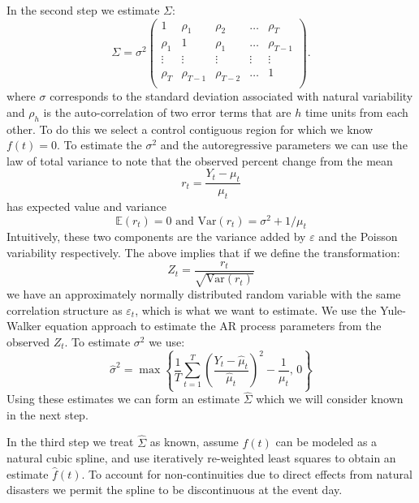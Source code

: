 \documentclass[11pt]{article}
\begin{document}
In the second step we estimate $\Sigma$:
\begin{equation*}
    \Sigma = \sigma^2
    \begin{pmatrix} 1 & \rho_1 & \rho_{2} & \dots & \rho_{T} \\ 
    \rho_{1} & 1 & \rho_{1} & \ldots & \rho_{T-1} \\
    \vdots & \vdots & \vdots & \vdots & \vdots \\
    \rho_{T} & \rho_{T-1} & \rho_{T-2} & \dots & 1 \\ 
    \end{pmatrix}.
\end{equation*}
where $\sigma$ corresponds to the standard deviation associated with natural variability and $\rho_h$ is the auto-correlation of two error terms that are $h$ time units from each other. To do this we select a control contiguous region for which we know $f(t)=0$. To estimate the $\sigma^2$ and the autoregressive parameters we can use the law of total variance to note that the observed percent change from the mean
\begin{equation*}
    r_t = \frac{Y_t - \mu_t}{\mu_t}
\end{equation*}
has expected value and variance
\begin{equation*}
    \mathbb{E}\left(r_t \right) = 0 \mbox{ and } \mbox{Var}\left(r_t\right)= \sigma^2 + 1/\mu_t
\end{equation*}
Intuitively, these two components are the variance added by $\varepsilon$ and the Poisson variability respectively. The above implies that if we define the transformation:
\begin{equation*}
    Z_t = \frac{r_t}{\sqrt{\mbox{Var}\left(r_t\right)}}
\end{equation*}
we have an approximately normally distributed random variable with the same correlation structure as $\varepsilon_t$, which is what we want to estimate. We use the Yule-Walker equation approach to estimate the AR process parameters from the observed $Z_t$. To estimate $\sigma^2$ we use:
\begin{equation*}
    \hat{\sigma}^2 = \max\left\{ \frac{1}{T}\sum_{t=1}^T  \left(\frac{Y_t - \hat{\mu}_t}{\hat{\mu}_t}\right)^2  - \frac{1}{\mu_t}, \, 0\right\}
\end{equation*}
Using these estimates we can form an estimate $\hat{\Sigma}$ which we will consider known in the next step.

In the third step we treat $\hat{\Sigma}$ as known, assume $f(t)$ can be modeled as a natural cubic spline, and use iteratively re-weighted least squares to obtain an estimate $\hat{f}(t)$. To account for non-continuities due to direct effects from natural disasters we permit the spline to be discontinuous at the event day. 
\end{document}
